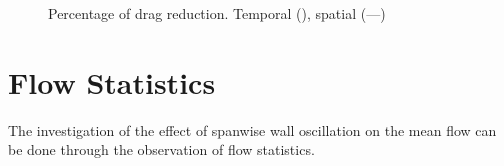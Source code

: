 \begin{figure}[!h]
  \centering
  \caption{Percentage of drag reduction. Temporal (\Cutline), spatial (---)}
  \label{fig:dr}
\end{figure}

\section{Flow Statistics}
The investigation of the effect of spanwise wall oscillation on the mean flow can be done through the observation of flow statistics.

